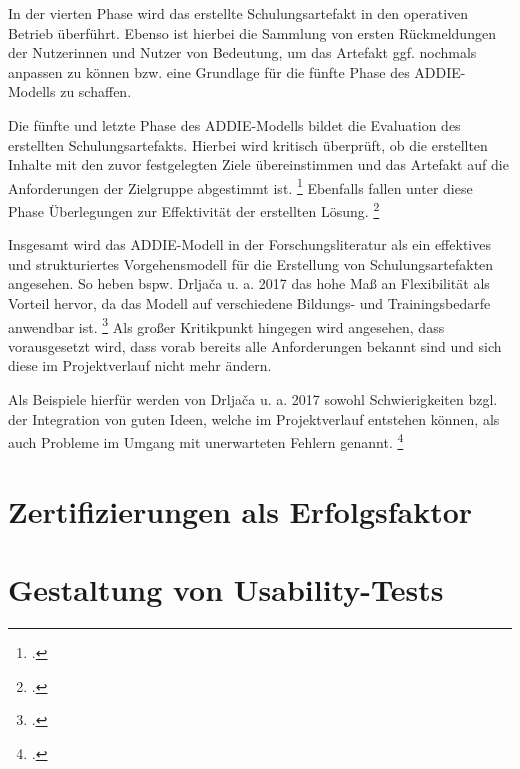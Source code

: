 In der vierten Phase wird das erstellte Schulungsartefakt in den operativen
Betrieb überführt. Ebenso ist hierbei die Sammlung von ersten Rückmeldungen
der Nutzerinnen und Nutzer von Bedeutung, um das Artefakt ggf. nochmals
anpassen zu können bzw. eine Grundlage für die fünfte Phase des \ac{ADDIE}-Modells zu schaffen.

Die fünfte und letzte Phase des \ac{ADDIE}-Modells bildet die Evaluation des erstellten Schulungsartefakts.
Hierbei wird kritisch überprüft, ob die erstellten Inhalte mit den zuvor festgelegten Ziele übereinstimmen und das Artefakt auf die Anforderungen der Zielgruppe abgestimmt ist.
\footcite[Vgl.][437]{allenOverviewEvolutionADDIE2006}
Ebenfalls fallen unter diese Phase Überlegungen zur Effektivität der erstellten Lösung.
\footcite[Vgl.][2]{constancioExtendedADDIEModel2018}

Insgesamt wird das \ac{ADDIE}-Modell in der Forschungsliteratur als ein effektives und strukturiertes Vorgehensmodell für die Erstellung von Schulungsartefakten angesehen.
So heben bspw. Drljača u. a. 2017 das hohe Maß an Flexibilität als Vorteil hervor, da das Modell auf verschiedene Bildungs- und Trainingsbedarfe anwendbar ist.
\footcite[Vgl.][247]{drljacaADDIEModelDevelopment2017}
Als großer Kritikpunkt hingegen wird angesehen, dass vorausgesetzt wird, dass vorab bereits
alle Anforderungen bekannt sind und sich diese im Projektverlauf nicht mehr ändern.

Als Beispiele hierfür werden von Drljača u. a. 2017 sowohl
Schwierigkeiten bzgl. der Integration von guten Ideen, welche
im Projektverlauf entstehen können, als auch Probleme im Umgang
mit unerwarteten Fehlern genannt.
\footcite[Vgl.][246]{drljacaADDIEModelDevelopment2017}

\section{Zertifizierungen als Erfolgsfaktor}
\section{Gestaltung von Usability-Tests}